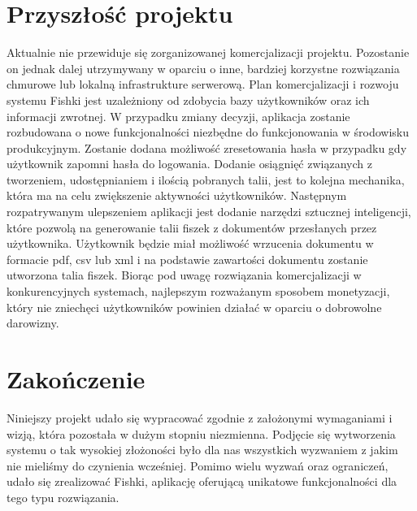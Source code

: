 \section{Przyszłość projektu}
Aktualnie nie przewiduje się zorganizowanej komercjalizacji projektu. Pozostanie on jednak dalej utrzymywany w oparciu o inne, bardziej korzystne rozwiązania chmurowe lub lokalną infrastrukture serwerową. Plan komercjalizacji i rozwoju systemu Fishki jest uzależniony od zdobycia bazy użytkowników oraz ich informacji zwrotnej. W przypadku zmiany decyzji, aplikacja zostanie rozbudowana o nowe funkcjonalności niezbędne do funkcjonowania w środowisku produkcyjnym. Zostanie dodana możliwość zresetowania hasła w przypadku gdy użytkownik zapomni hasła do logowania. Dodanie osiągnięć związanych z tworzeniem, udostępnianiem i ilością pobranych talii, jest to kolejna mechanika, która ma na celu zwiększenie aktywności użytkowników. Następnym rozpatrywanym ulepszeniem aplikacji jest dodanie narzędzi sztucznej inteligencji, które pozwolą na generowanie talii fiszek z dokumentów przesłanych przez użytkownika. Użytkownik będzie miał możliwość wrzucenia dokumentu w formacie pdf, csv lub xml i na podstawie zawartości dokumentu zostanie utworzona talia fiszek. Biorąc pod uwagę rozwiązania komercjalizacji w konkurencyjnych systemach, najlepszym rozważanym sposobem monetyzacji, który nie zniechęci użytkowników powinien działać w oparciu o dobrowolne darowizny.


\section{Zakończenie}
Niniejszy projekt udało się wypracować zgodnie z założonymi wymaganiami i wizją, która pozostała w dużym stopniu niezmienna. Podjęcie się wytworzenia systemu o tak wysokiej złożoności było dla nas wszystkich wyzwaniem z jakim nie mieliśmy do czynienia wcześniej. Pomimo wielu wyzwań oraz ograniczeń, udało się zrealizować Fishki, aplikację oferującą unikatowe funkcjonalności dla tego typu rozwiązania.

